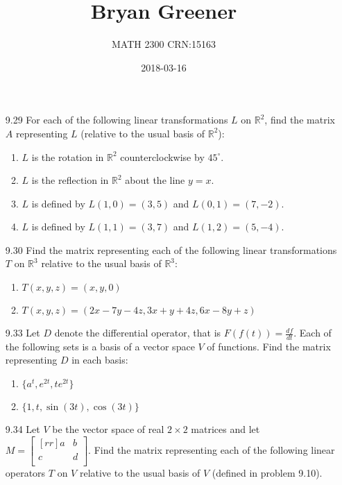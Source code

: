 \documentclass[12pt]{article}
\title{Bryan Greener}
\author{MATH 2300 CRN:15163}
\date{2018-03-16}
\theoremstyle{definition}
\theoremstyle{plain}
\begin{document}
\maketitle

\TabPositions{4cm}

\begin{enumerate}
\item[9.29]For each of the following linear transformations $L$ on $\mathbb{R}^2$, find the matrix $A$ representing $L$ (relative to the usual basis of $\mathbb{R}^2$):
	\begin{enumerate}
	\item $L$ is the rotation in $\mathbb{R}^2$ counterclockwise by $45^\circ$.
	\item $L$ is the reflection in $\mathbb{R}^2$ about the line $y=x$.
	\item $L$ is defined by $L(1,0)=(3,5)$ and $L(0,1)=(7,-2)$.
	\item $L$ is defined by $L(1,1)=(3,7)$ and $L(1,2)=(5,-4)$.
	\end{enumerate}
\item[9.30]Find the matrix representing each of the following linear transformations $T$ on $\mathbb{R}^3$ relative to the usual basis of $\mathbb{R}^3$:
	\begin{enumerate}
	\item $T(x,y,z)=(x,y,0)$
	\item $T(x,y,z)=(2x-7y-4z,3x+y+4z,6x-8y+z)$
	\end{enumerate}
\item[9.33]Let $D$ denote the differential operator, that is $F(f(t))=\frac{df}{dt}$. Each of the following sets is a basis of a vector space $V$ of functions. Find the matrix representing $D$ in each basis:
	\begin{enumerate}
	\item $\{a^t,e^{2t},te^{2t}\}$
	\item $\{1,t,\sin(3t),\cos(3t)\}$
	\end{enumerate}
\item[9.34]Let $V$ be the vector space of real $2\times2$ matrices and let $M=\begin{bmatrix}[rr]a&b\\c&d\\\end{bmatrix}$. Find the matrix representing each of the following linear operators $T$ on $V$ relative to the usual basis of $V$ (defined in problem 9.10).
	\begin{enumerate}

\end{enumerate}
\end{enumerate}
\end{document}
